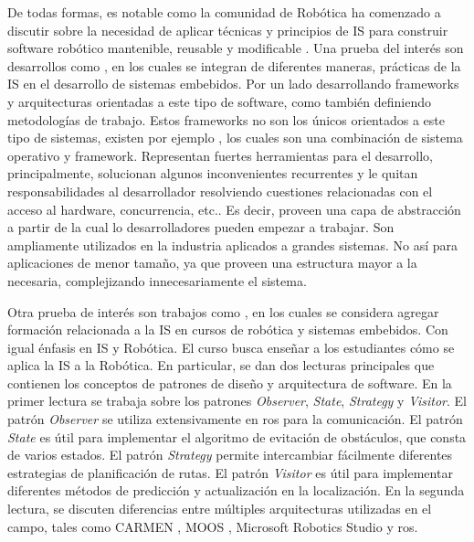 De todas formas, es notable como la comunidad de Robótica ha comenzado a discutir sobre la necesidad de aplicar técnicas y principios de IS para construir software robótico mantenible, reusable y modificable \cite{Brugali2009, mejoras-2}. Una prueba del interés son desarrollos como \cite{FernandezMadrigal2003, model,model1,model2,model3}, en los cuales se integran de diferentes maneras, prácticas de la IS en el desarrollo de sistemas embebidos. Por un lado desarrollando \glspl{framework} y arquitecturas orientadas a este tipo de software, como también definiendo metodologías de trabajo. Estos \glspl{framework} no son los únicos orientados a este tipo de sistemas, existen por ejemplo \cite{framework-1, framework-ros}, los cuales son una combinación de sistema operativo y framework. Representan fuertes herramientas para el desarrollo, principalmente, solucionan algunos inconvenientes recurrentes y le quitan responsabilidades al desarrollador resolviendo cuestiones relacionadas con el acceso al hardware, concurrencia, etc.. Es decir, proveen una capa de abstracción a partir de la cual lo desarrolladores pueden empezar a trabajar. Son ampliamente utilizados en la industria aplicados a grandes sistemas. No así para aplicaciones de menor tamaño, ya que proveen una estructura mayor a la necesaria, complejizando innecesariamente el sistema.

Otra prueba de interés son trabajos como \cite{Shin15fase}, en los cuales se considera agregar formación relacionada a la \gls{IS} en cursos de robótica y sistemas embebidos. Con igual énfasis en \gls{IS} y Robótica. El curso busca enseñar a los estudiantes cómo se aplica la \gls{IS} a la Robótica. En particular, se dan dos lecturas principales que contienen los conceptos de patrones de diseño y arquitectura de software. En la primer lectura se trabaja sobre los patrones \textit{Observer}, \textit{State}, \textit{Strategy} y \textit{Visitor}. El patrón \textit{Observer} se utiliza extensivamente en \gls{ros}\cite{framework-ros} para la comunicación. El patrón \textit{State} es útil para implementar el algoritmo de evitación de obstáculos, que consta de varios estados. El patrón \textit{Strategy} permite intercambiar fácilmente diferentes estrategias de planificación de rutas. El patrón \textit{Visitor} es útil para implementar diferentes métodos de predicción y actualización en la localización. En la segunda lectura, se discuten diferencias entre múltiples arquitecturas utilizadas en el campo, tales como CARMEN \cite{carmen}, MOOS \cite{moos}, Microsoft Robotics Studio \cite{microsoft} y \gls{ros}\cite{framework-ros}. 

